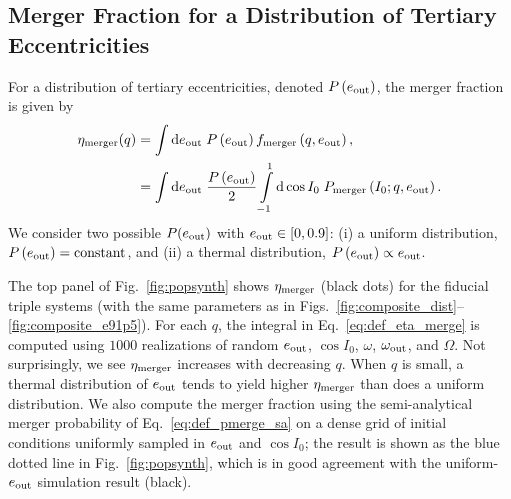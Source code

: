 \documentclass[
        fleqn,
        usenatbib,
    ]{mnras}
\newcommand*{\p}[1]{\left(#1\right)}
\begin{document}
\subsection{Merger Fraction for a Distribution of Tertiary Eccentricities}

For a distribution of tertiary eccentricities, denoted $P\p{e_{\rm out}}$, the
merger fraction is given by
\begin{align}
    \eta_{\rm merger}(q) &= \int \mathrm{d}e_{\rm out}\;
            P\p{e_{\rm out}} f_{\rm merger}\p{q, e_{\rm out}},\nonumber\\
        &= \int\limits\mathrm{d} e_{\rm out}\; \frac{P\p{e_{\rm out}}}{2}
            \int\limits_{-1}^1\mathrm{d} \cos I_0\; P_{\rm merger}\p{I_0; q,
            e_{\rm out}}.
        \label{eq:def_eta_merge}
\end{align}
We consider two possible $P(e_{\rm out})$ with $e_{\rm out} \in [0, 0.9]$: (i) a
uniform distribution, $P\p{e_{\rm out}} = \textrm{constant}$, and (ii) a thermal
distribution, $P\p{e_{\rm out}} \propto e_{\rm out}$.

The top panel of Fig.~\ref{fig:popsynth} shows $\eta_{\rm merger}$ (black
dots) for the fiducial triple systems (with the same parameters as in
Figs.~\ref{fig:composite_dist}--\ref{fig:composite_e91p5}). For each $q$, the
integral in Eq.~\eqref{eq:def_eta_merge} is computed using $1000$ realizations
of random $e_{\rm out}$, $\cos I_0$, $\omega$, $\omega_{\rm out}$, and
$\Omega$. Not surprisingly, we see $\eta_{\rm merger}$ increases with decreasing
$q$. When $q$ is small, a thermal distribution of $e_{\rm out}$ tends to yield
higher $\eta_{\rm merger}$ than does a uniform distribution. We also compute the
merger fraction using the semi-analytical merger probability of
Eq.~\eqref{eq:def_pmerge_sa} on a dense grid of initial conditions uniformly
sampled in $e_{\rm out}$ and $\cos I_0$; the result is shown as the blue dotted
line in Fig.~\ref{fig:popsynth}, which is in good agreement with the
uniform-$e_{\rm out}$ simulation result (black).
\end{document}
